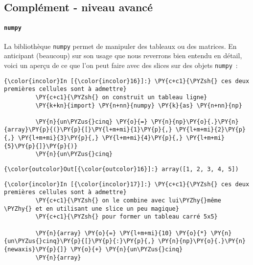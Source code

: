     \hypertarget{compluxe9ment---niveau-avancuxe9}{%
\subsection{Complément - niveau
avancé}\label{compluxe9ment---niveau-avancuxe9}}

    \hypertarget{numpy}{%
\paragraph{\texorpdfstring{\texttt{numpy}}{numpy}}\label{numpy}}

    La bibliothèque \texttt{numpy} permet de manipuler des tableaux ou des
matrices. En anticipant (beaucoup) sur son usage que nous reverrons bien
entendu en détail, voici un aperçu de ce que l'on peut faire avec des
slices sur des objets \texttt{numpy}~:

    \begin{Verbatim}[commandchars=\\\{\},frame=single,framerule=0.3mm,rulecolor=\color{cellframecolor}]
{\color{incolor}In [{\color{incolor}16}]:} \PY{c+c1}{\PYZsh{} ces deux premières cellules sont à admettre}
         \PY{c+c1}{\PYZsh{} on construit un tableau ligne}
         \PY{k+kn}{import} \PY{n+nn}{numpy} \PY{k}{as} \PY{n+nn}{np}
         
         \PY{n}{un\PYZus{}cinq} \PY{o}{=} \PY{n}{np}\PY{o}{.}\PY{n}{array}\PY{p}{(}\PY{p}{[}\PY{l+m+mi}{1}\PY{p}{,} \PY{l+m+mi}{2}\PY{p}{,} \PY{l+m+mi}{3}\PY{p}{,} \PY{l+m+mi}{4}\PY{p}{,} \PY{l+m+mi}{5}\PY{p}{]}\PY{p}{)}
         \PY{n}{un\PYZus{}cinq}
\end{Verbatim}


\begin{Verbatim}[commandchars=\\\{\},frame=single,framerule=0.3mm,rulecolor=\color{cellframecolor}]
{\color{outcolor}Out[{\color{outcolor}16}]:} array([1, 2, 3, 4, 5])
\end{Verbatim}
            
    \begin{Verbatim}[commandchars=\\\{\},frame=single,framerule=0.3mm,rulecolor=\color{cellframecolor}]
{\color{incolor}In [{\color{incolor}17}]:} \PY{c+c1}{\PYZsh{} ces deux premières cellules sont à admettre}
         \PY{c+c1}{\PYZsh{} on le combine avec lui\PYZhy{}même \PYZhy{} et en utilisant une slice un peu magique}
         \PY{c+c1}{\PYZsh{} pour former un tableau carré 5x5}
         
         \PY{n}{array} \PY{o}{=} \PY{l+m+mi}{10} \PY{o}{*} \PY{n}{un\PYZus{}cinq}\PY{p}{[}\PY{p}{:}\PY{p}{,} \PY{n}{np}\PY{o}{.}\PY{n}{newaxis}\PY{p}{]} \PY{o}{+} \PY{n}{un\PYZus{}cinq}
         \PY{n}{array}
\end{Verbatim}


